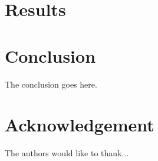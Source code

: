 \documentclass[conference]{IEEEtran}
\begin{document}
\section{Results}

\section{Conclusion}
The conclusion goes here.

\section*{Acknowledgement}


The authors would like to thank...



%
%
%

\printbibliography




\end{document}
